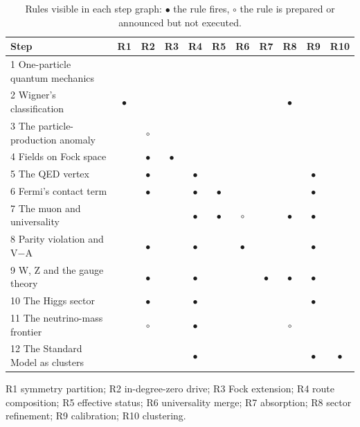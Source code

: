 \begin{table}[htbp]\centering\small
\caption{Rules visible in each step graph: $\bullet$ the rule fires, $\circ$ the rule is prepared or announced but not executed.}\label{tab:rulematrix}
\begin{tabular}{@{}lcccccccccc@{}}\toprule
Step & R1 & R2 & R3 & R4 & R5 & R6 & R7 & R8 & R9 & R10\\\midrule
1 One-particle quantum mechanics &  &  &  &  &  &  &  &  &  & \\
2 Wigner's classification & $\bullet$ &  &  &  &  &  &  & $\bullet$ &  & \\
3 The particle-production anomaly &  & $\circ$ &  &  &  &  &  &  &  & \\
4 Fields on Fock space &  & $\bullet$ & $\bullet$ &  &  &  &  &  &  & \\
5 The QED vertex &  & $\bullet$ &  & $\bullet$ &  &  &  &  & $\bullet$ & \\
6 Fermi's contact term &  & $\bullet$ &  & $\bullet$ & $\bullet$ &  &  &  & $\bullet$ & \\
7 The muon and universality &  &  &  & $\bullet$ & $\bullet$ & $\circ$ &  & $\bullet$ & $\bullet$ & \\
8 Parity violation and V−A &  & $\bullet$ &  & $\bullet$ &  & $\bullet$ &  &  & $\bullet$ & \\
9 W, Z and the gauge theory &  & $\bullet$ &  & $\bullet$ &  &  & $\bullet$ & $\bullet$ & $\bullet$ & \\
10 The Higgs sector &  & $\bullet$ &  & $\bullet$ &  &  &  &  & $\bullet$ & \\
11 The neutrino-mass frontier &  & $\circ$ &  & $\bullet$ &  &  &  & $\circ$ &  & \\
12 The Standard Model as clusters &  &  &  & $\bullet$ &  &  &  &  & $\bullet$ & $\bullet$\\
\bottomrule\end{tabular}
\par\smallskip\noindent\footnotesize R1 symmetry partition; R2 in-degree-zero drive; R3 Fock extension; R4 route composition; R5 effective status; R6 universality merge; R7 absorption; R8 sector refinement; R9 calibration; R10 clustering.
\end{table}
